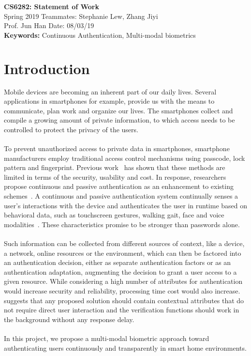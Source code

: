 \documentclass[a4paper, 11pt]{article}
\begin{document}
\noindent
\large\textbf{CS6282: Statement of Work} \hfill  \\
\normalsize Spring 2019 \hfill Teammates: Stephanie Lew, Zhang Jiyi \\
Prof. Jun Han \hfill  Date: 08/03/19 \\

{\bf Keywords:} Continuous Authentication, Multi-modal biometrics
\section*{Introduction}
Mobile devices are becoming an inherent part of our daily lives. Several applications in smartphones for example, provide us with the means to communicate, plan work and organize our lives. The smartphones collect and compile a growing amount of private information, to which access needs to be controlled to protect the privacy of the users. \\\\
\noindent
To prevent unauthorized access to private data in smartphones, smartphone manufacturers employ traditional access control mechanisms using passcode, lock pattern and fingerprint. Previous work~\cite{} has shown that these methods are limited in terms of the security, usability and cost. In response, researchers propose continuous and passive authentication as an enhancement to existing schemes~\cite{}. A continuous and passive authentication system continually senses a user’s interactions with the device and authenticates the user in runtime based on behavioral data, such as touchscreen gestures, walking gait, face and voice modalities~\cite{}. These characteristics promise to be stronger than passwords alone.\\\\
\noindent
Such information can be collected from different sources of context, like a device, a network, online resources or the environment, which can then be factored into an authentication decision, either as separate authentication factors or as an authentication adaptation, augmenting the decision to grant a user access to a given resource. While considering a high number of attributes for authentication would increase security and reliability, processing time cost would also increase. \cite{}suggests that any proposed solution should contain contextual attributes that do not require direct user interaction and the verification functions should work in the background without any response delay. \\\\
\noindent
In this project, we propose a multi-modal biometric approach toward authenticating users continuously and transparently in smart home environments.
\end{document}
